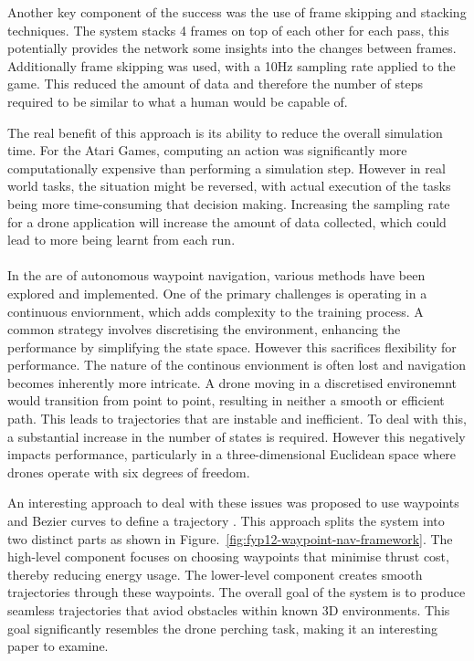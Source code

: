 Another key component of the success was the use of frame skipping and stacking techniques.
The system stacks 4 frames on top of each other for each pass, this potentially provides the network some insights into the changes between frames.
Additionally frame skipping was used, with a 10Hz sampling rate applied to the game.
This reduced the amount of data and therefore the number of steps required to be similar to what a human would be capable of.

The real benefit of this approach is its ability to reduce the overall simulation time.
For the Atari Games, computing an action was significantly more computationally expensive than performing a simulation step.
However in real world tasks, the situation might be reversed, with actual execution of the tasks being more time-consuming that decision making.
Increasing the sampling rate for a drone application will increase the amount of data collected, which could lead to more being learnt from each run. \\\\


In the are of autonomous waypoint navigation, various methods have been explored and implemented.
One of the primary challenges is operating in a continuous enviornment, which adds complexity to the training process.
A common strategy involves discretising the environment, enhancing the performance by simplifying the state space.
However this sacrifices flexibility for performance.
The nature of the continous envionment is often lost and navigation becomes inherently more intricate.
A drone moving in a discretised environemnt would transition from point to point, resulting in neither a smooth or efficient path.
This leads to trajectories that are instable and inefficient.
To deal with this, a substantial increase in the number of states is required.
However this negatively impacts performance, particularly in a three-dimensional Euclidean space where drones operate with six degrees of freedom.

An interesting approach to deal with these issues was proposed to use waypoints and Bezier curves to define a trajectory \cite{fyp12-waypoint-navigation}.
This approach splits the system into two distinct parts as shown in Figure.~\ref{fig:fyp12-waypoint-nav-framework}.
The high-level component focuses on choosing waypoints that minimise thrust cost, thereby reducing energy usage.
The lower-level component creates smooth trajectories through these waypoints.
The overall goal of the system is to produce seamless trajectories that aviod obstacles within known 3D environments.
This goal significantly resembles the drone perching task, making it an interesting paper to examine.

